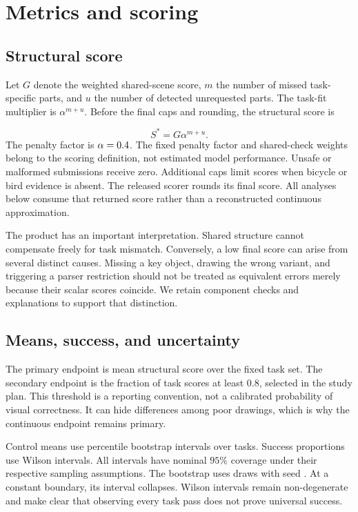 \documentclass{article}
\begin{document}
\section{Metrics and scoring}
\subsection{Structural score}
Let $G$ denote the weighted shared-scene score, $m$ the number of missed task-specific parts, and $u$ the number of detected unrequested parts. The task-fit multiplier is $\alpha^{m+u}$. Before the final caps and rounding, the structural score is

\begin{equation} S^{*}=G\alpha^{m+u}. \end{equation}
The penalty factor is $\alpha=0.4{}$. The fixed penalty factor and shared-check weights belong to the scoring definition, not estimated model performance. Unsafe or malformed submissions receive zero. Additional caps limit scores when bicycle or bird evidence is absent. The released scorer rounds its final score. All analyses below consume that returned score rather than a reconstructed continuous approximation.

The product has an important interpretation. Shared structure cannot compensate freely for task mismatch. Conversely, a low final score can arise from several distinct causes. Missing a key object, drawing the wrong variant, and triggering a parser restriction should not be treated as equivalent errors merely because their scalar scores coincide. We retain component checks and explanations to support that distinction.

\subsection{Means, success, and uncertainty}
The primary endpoint is mean structural score over the fixed task set. The secondary endpoint is the fraction of task scores at least $0.8$, selected in the study plan. This threshold is a reporting convention, not a calibrated probability of visual correctness. It can hide differences among poor drawings, which is why the continuous endpoint remains primary.

Control means use percentile bootstrap intervals over tasks. Success proportions use Wilson intervals. All intervals have nominal $95\%$ coverage under their respective sampling assumptions. The bootstrap uses \bootDraws{} draws with seed \bootSeed{}. At a constant boundary, its interval collapses. Wilson intervals remain non-degenerate and make clear that observing every task pass does not prove universal success.
\end{document}
